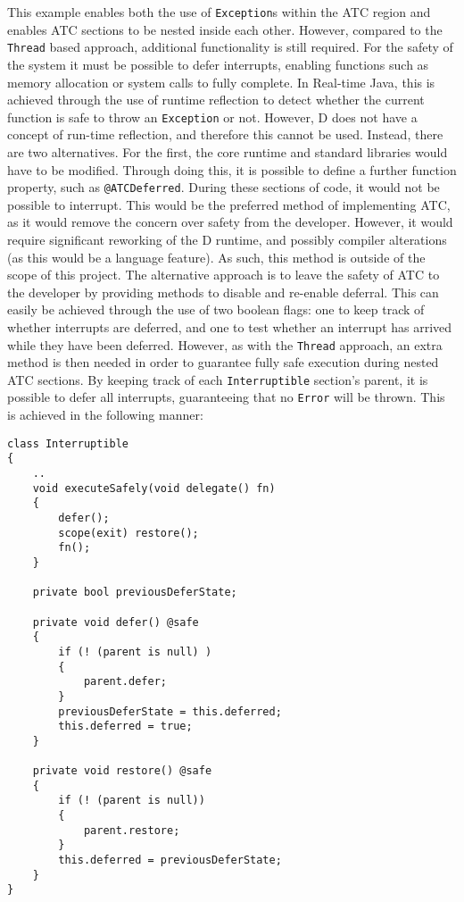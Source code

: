 This example enables both the use of \texttt{Exception}s within the ATC region and
enables ATC sections to be nested inside each other. However, compared to the
\texttt{Thread} based approach, additional functionality is still required. 
For the safety of the system it must be possible to defer interrupts, enabling 
functions such as memory allocation or system calls to fully complete. In
Real-time Java, this is achieved through the use of runtime reflection to detect
whether the current function is safe to throw an \texttt{Exception} or not.
However, D does not have a concept of run-time reflection, and therefore this cannot be
used. 
Instead, there are two alternatives. For the first, the core runtime and standard
libraries would have to be modified. Through doing this, it is possible to
define a further function property, such as \texttt{@ATCDeferred}.  During these
sections of code, it would not be possible to interrupt. This
would be the preferred method of implementing ATC, as it would remove the
concern over safety from the developer. However, it would require significant
reworking of the D runtime, and possibly compiler alterations (as this would be
a language feature). As such, this method is outside of the scope of this
project. 
The alternative approach is to leave the safety of ATC to the developer by
providing methods to disable and re-enable deferral.
This can easily be achieved through the use of two boolean flags: one to keep track
of whether interrupts are deferred, and one to test whether an interrupt has
arrived while they have been deferred. 
However, as with the \texttt{Thread} approach, an extra method is then needed in 
order to guarantee fully safe execution during nested ATC sections. By keeping
track of each \texttt{Interruptible} section's parent, it is possible to defer
all interrupts, guaranteeing that no \texttt{Error} will be thrown. This is
achieved in the following manner: 
\begin{lstlisting}
class Interruptible
{
    ..
    void executeSafely(void delegate() fn) 
    {
        defer();
        scope(exit) restore();
        fn();
    }

    private bool previousDeferState;

    private void defer() @safe
    {
        if (! (parent is null) )
        {
            parent.defer;
        }
        previousDeferState = this.deferred;
        this.deferred = true;
    }

    private void restore() @safe
    {
        if (! (parent is null))
        {
            parent.restore;
        }
        this.deferred = previousDeferState;
    }
}
\end{lstlisting}
